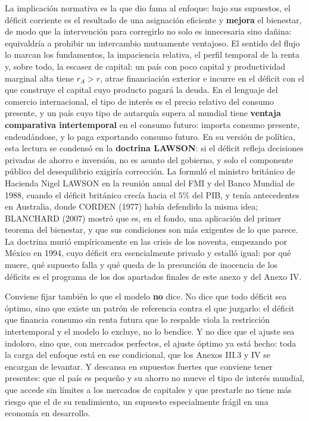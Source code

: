 \documentclass[10pt,a4paper]{article}
\newcounter{anexo}
\begin{document}
La implicación normativa es la que dio fama al enfoque: bajo sus supuestos, el déficit corriente es el resultado de una asignación eficiente y \textbf{mejora} el bienestar, de modo que la intervención para corregirlo no solo es innecesaria sino dañina: equivaldría a prohibir un intercambio mutuamente ventajoso. El sentido del flujo lo marcan los fundamentos, la impaciencia relativa, el perfil temporal de la renta y, sobre todo, la escasez de capital: un país con poco capital y productividad marginal alta tiene $r_A>r$, atrae financiación exterior e incurre en el déficit con el que construye el capital cuyo producto pagará la deuda. En el lenguaje del comercio internacional, el tipo de interés es el precio relativo del consumo presente, y un país cuyo tipo de autarquía supera al mundial tiene \textbf{ventaja comparativa intertemporal} en el consumo futuro: importa consumo presente, endeudándose, y lo paga exportando consumo futuro. En su versión de política, esta lectura se condensó en la \textbf{doctrina LAWSON}: si el déficit refleja decisiones privadas de ahorro e inversión, no es asunto del gobierno, y solo el componente público del desequilibrio exigiría corrección. La formuló el ministro británico de Hacienda Nigel LAWSON en la reunión anual del FMI y del Banco Mundial de 1988, cuando el déficit británico crecía hacia el $5\%$ del PIB, y tenía antecedentes en Australia, donde CORDEN (1977) había defendido la misma idea; BLANCHARD (2007) mostró que es, en el fondo, una aplicación del primer teorema del bienestar, y que sus condiciones son más exigentes de lo que parece. La doctrina murió empíricamente en las crisis de los noventa, empezando por México en 1994, cuyo déficit era esencialmente privado y estalló igual: por qué muere, qué supuesto falla y qué queda de la presunción de inocencia de los déficits es el programa de los dos apartados finales de este anexo y del Anexo IV.

Conviene fijar también lo que el modelo \textbf{no} dice. No dice que todo déficit sea óptimo, sino que existe un patrón de referencia contra el que juzgarlo: el déficit que financia consumo sin renta futura que lo respalde viola la restricción intertemporal y el modelo lo excluye, no lo bendice. Y no dice que el ajuste sea indoloro, sino que, con mercados perfectos, el ajuste óptimo ya está hecho: toda la carga del enfoque está en ese condicional, que los Anexos III.3 y IV se encargan de levantar. Y descansa en supuestos fuertes que conviene tener presentes: que el país es pequeño y su ahorro no mueve el tipo de interés mundial, que accede sin límites a los mercados de capitales y que prestarle no tiene más riesgo que el de su rendimiento, un supuesto especialmente frágil en una economía en desarrollo.
\end{document}
